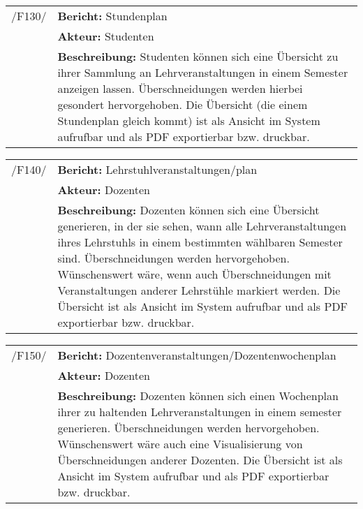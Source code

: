 \begin{tabular}{p{1.5cm}p{14.5cm}}
	
	 /F130/& \textbf{Bericht:} Stundenplan \\
				& \textbf{Akteur:} Studenten \\
				& \textbf{Beschreibung:} Studenten können sich eine Übersicht zu ihrer Sammlung an Lehrveranstaltungen in einem Semester anzeigen lassen. Überschneidungen werden hierbei gesondert hervorgehoben. Die Übersicht (die einem Stundenplan gleich kommt) ist als Ansicht im System aufrufbar und als PDF exportierbar bzw. druckbar. \\[0.25cm]

				
\end{tabular}


\begin{tabular}{p{1.5cm}p{14.5cm}}
	
	 /F140/& \textbf{Bericht:} Lehrstuhlveranstaltungen/plan \\
				& \textbf{Akteur:} Dozenten \\
				& \textbf{Beschreibung:} Dozenten können sich eine Übersicht generieren, in der sie sehen, wann alle Lehrveranstaltungen ihres Lehrstuhls in einem bestimmten wählbaren Semester sind. Überschneidungen werden hervorgehoben. Wünschenswert wäre, wenn auch Überschneidungen mit Veranstaltungen anderer Lehrstühle markiert werden. Die Übersicht ist als Ansicht im System aufrufbar und als PDF exportierbar bzw. druckbar. \\[0.25cm]

				
\end{tabular}


\begin{tabular}{p{1.5cm}p{14.5cm}}
	
	 /F150/& \textbf{Bericht:} Dozentenveranstaltungen/Dozentenwochenplan \\
				& \textbf{Akteur:} Dozenten \\
				& \textbf{Beschreibung:} Dozenten können sich einen Wochenplan ihrer zu haltenden Lehrveranstaltungen in einem semester generieren. Überschneidungen werden hervorgehoben. Wünschenswert wäre auch eine Visualisierung von Überschneidungen anderer Dozenten. Die Übersicht ist als Ansicht im System aufrufbar und als PDF exportierbar bzw. druckbar. \\[0.25cm]

				
\end{tabular}